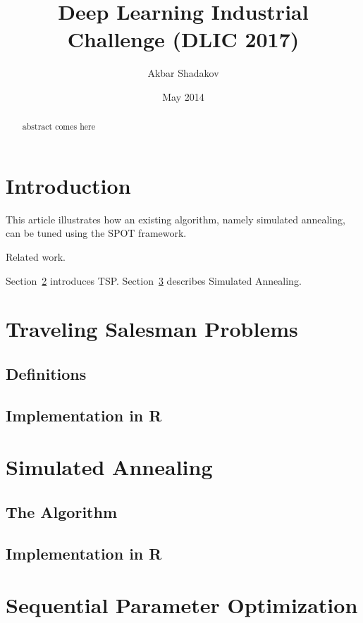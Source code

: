 \documentclass[runningheads]{llncs}
\begin{document}
\mainmatter
\title{Deep Learning Industrial Challenge (DLIC 2017) 
}
\author{Akbar Shadakov}
\date{May 2014}
\maketitle

\begin{abstract} abstract comes here
\end{abstract}

\section{Introduction}
This article illustrates how an existing algorithm, namely simulated annealing, can be tuned using the
SPOT framework.

Related work.

Section~\ref{sec:tsp} introduces TSP.
Section~\ref{sec:sann} describes Simulated Annealing.

\section{Traveling Salesman Problems}\label{sec:tsp}
\subsection{Definitions}
\subsection{Implementation in R}

\section{Simulated Annealing}\label{sec:sann}
\subsection{The Algorithm}

\subsection{Implementation in R}

\section{Sequential Parameter Optimization}
\end{document}
